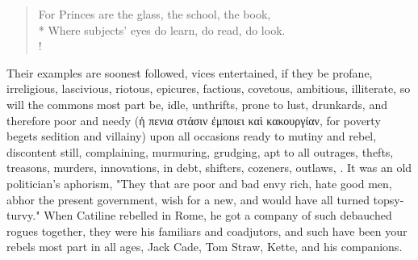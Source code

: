 \begin{verse}%
For Princes are the glass, the school, the book,\\*
Where subjects' eyes do learn, do read, do look.\\!
\end{verse}%


Their examples are soonest followed, vices entertained, if they be profane,
irreligious, lascivious, riotous, epicures, factious, covetous, ambitious,
illiterate, so will the commons most part be, idle, unthrifts, prone to lust,
drunkards, and therefore poor and needy (\textgreek{ἡ πενια στάσιν ἐμποιει καὶ
κακουργίαν}, for poverty begets sedition and villainy) upon all occasions ready
to mutiny and rebel, discontent still, complaining, murmuring, grudging, apt to
all outrages, thefts, treasons, murders, innovations, in debt, shifters,
cozeners, outlaws, . It was an old
politician's aphorism, "They that are poor and bad envy
rich, hate good men, abhor the present government, wish for a new, and would
have all turned topsy-turvy." When Catiline rebelled in Rome, he got a company
of such debauched rogues together, they were his familiars and coadjutors, and
such have been your rebels most part in all ages, Jack Cade, Tom Straw, Kette,
and his companions.

